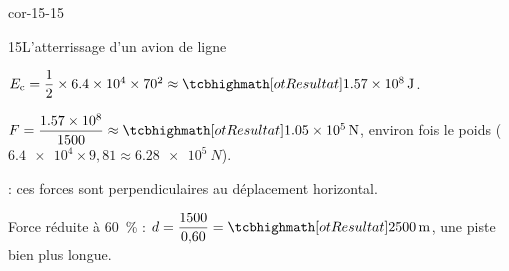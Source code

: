 \begin{blocLivre}{cor-15-15}
\begin{corrige}{15}{L'atterrissage d'un avion de ligne}
\begin{questions}
\item $E_\mathrm{c}=\dfrac{1}{2}\times\num{6,4e4}\times70^2\approx\res{\qty{1,57e8}{J}}$.
\item $F=\dfrac{\num{1,57e8}}{1500}\approx\res{\qty{1,05e5}{N}}$, environ  fois le poids ($\num{6,4e4}\times9{,}81\approx\qty{6,28e5}{N}$).
\item {} : ces forces sont perpendiculaires au déplacement horizontal.
\item Force réduite à \qty{60}{\percent} : $d=\dfrac{1500}{0{,}60}=\res{\qty{2500}{m}}$, une piste bien plus longue.
\end{questions}
\end{corrige}
\end{blocLivre}
